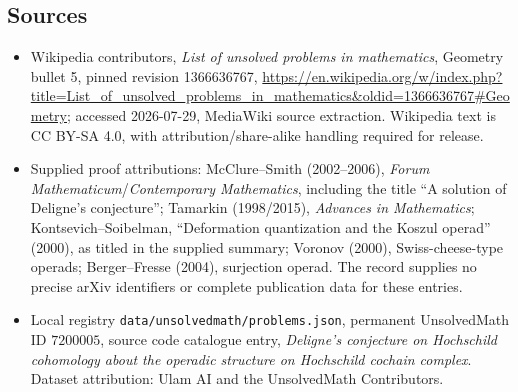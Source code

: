 \documentclass[11pt]{article}
\begin{document}
\subsection{Sources}
\begin{itemize}
\item Wikipedia contributors, \emph{List of unsolved problems in mathematics}, Geometry bullet 5, pinned revision 1366636767, \url{https://en.wikipedia.org/w/index.php?title=List_of_unsolved_problems_in_mathematics&oldid=1366636767#Geometry}; accessed 2026-07-29, MediaWiki source extraction. Wikipedia text is CC BY-SA 4.0, with attribution/share-alike handling required for release.
\item Supplied proof attributions: McClure--Smith (2002--2006), \emph{Forum Mathematicum}/\emph{Contemporary Mathematics}, including the title ``A solution of Deligne's conjecture''; Tamarkin (1998/2015), \emph{Advances in Mathematics}; Kontsevich--Soibelman, ``Deformation quantization and the Koszul operad'' (2000), as titled in the supplied summary; Voronov (2000), Swiss-cheese-type operads; Berger--Fresse (2004), surjection operad. The record supplies no precise arXiv identifiers or complete publication data for these entries.
\item Local registry \texttt{data/unsolvedmath/problems.json}, permanent UnsolvedMath ID $7200005$, source code catalogue entry, \emph{Deligne's conjecture on Hochschild cohomology about the operadic structure on Hochschild cochain complex}. Dataset attribution: Ulam AI and the UnsolvedMath Contributors.
\end{itemize}
\end{document}
